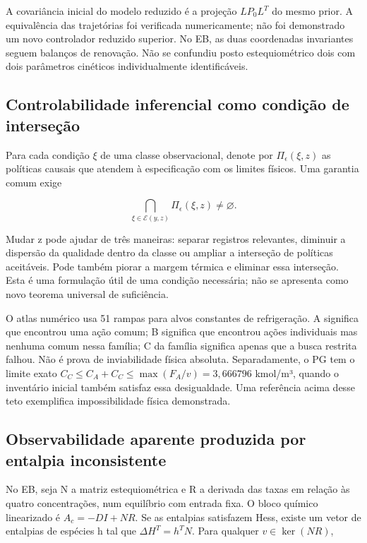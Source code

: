 \documentclass[
  11pt,
  letterpaper,
]{article}
\begin{document}
A covariância inicial do modelo reduzido é a projeção \(LP_0L^T\) do
mesmo prior. A equivalência das trajetórias foi verificada
numericamente; não foi demonstrado um novo controlador reduzido
superior. No EB, as duas coordenadas invariantes seguem balanços de
renovação. Não se confundiu posto estequiométrico dois com dois
parâmetros cinéticos individualmente identificáveis.

\hypertarget{controlabilidade-inferencial-como-condiuxe7uxe3o-de-interseuxe7uxe3o}{%
\subsection{Controlabilidade inferencial como condição de
interseção}\label{controlabilidade-inferencial-como-condiuxe7uxe3o-de-interseuxe7uxe3o}}

Para cada condição \(\xi\) de uma classe observacional, denote por
\(\Pi_\epsilon(\xi,z)\) as políticas causais que atendem à especificação
com os limites físicos. Uma garantia comum exige

\[
\bigcap_{\xi\in\mathcal E(y,z)}\Pi_\epsilon(\xi,z)\ne\varnothing .
\]

Mudar z pode ajudar de três maneiras: separar registros relevantes,
diminuir a dispersão da qualidade dentro da classe ou ampliar a
interseção de políticas aceitáveis. Pode também piorar a margem térmica
e eliminar essa interseção. Esta é uma formulação útil de uma condição
necessária; não se apresenta como novo teorema universal de suficiência.

O atlas numérico usa 51 rampas para alvos constantes de refrigeração. A
significa que encontrou uma ação comum; B significa que encontrou ações
individuais mas nenhuma comum nessa família; C da família significa
apenas que a busca restrita falhou. Não é prova de inviabilidade física
absoluta. Separadamente, o PG tem o limite exato
\(C_C\le C_A+C_C\le\max(F_A/v)=3,666796\) kmol/m³, quando o inventário
inicial também satisfaz essa desigualdade. Uma referência acima desse
teto exemplifica impossibilidade física demonstrada.

\hypertarget{observabilidade-aparente-produzida-por-entalpia-inconsistente}{%
\subsection{Observabilidade aparente produzida por entalpia
inconsistente}\label{observabilidade-aparente-produzida-por-entalpia-inconsistente}}

No EB, seja N a matriz estequiométrica e R a derivada das taxas em
relação às quatro concentrações, num equilíbrio com entrada fixa. O
bloco químico linearizado é \(A_c=-DI+NR\). Se as entalpias satisfazem
Hess, existe um vetor de entalpias de espécies h tal que
\(\Delta H^T=h^TN\). Para qualquer \(v\in\ker(NR)\),
\end{document}
